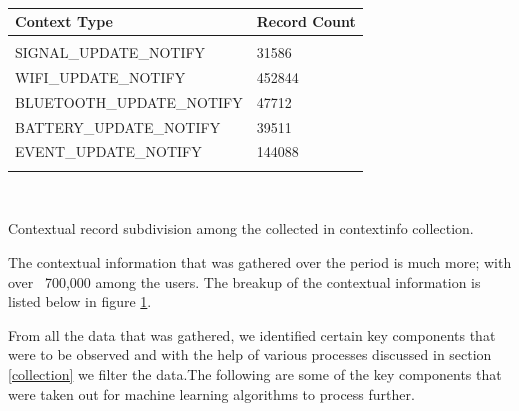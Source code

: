 \documentclass[prodmode,acmtecs]{acmsmall}
\begin{document}
\begin{table}[htdp]

\begin{tabularx}{\textwidth}{ XX }
 
  \textbf{Context Type} & \textbf{Record Count} \\
   \hline
   \\
  SIGNAL\_UPDATE\_NOTIFY  & 31586  \\
  WIFI\_UPDATE\_NOTIFY   & 452844  \\
  BLUETOOTH\_UPDATE\_NOTIFY   &  47712    \\ 
  BATTERY\_UPDATE\_NOTIFY  & 39511  \\
  EVENT\_UPDATE\_NOTIFY   &  144088    \\ 
  \\
   \hline
  \end{tabularx}
\\
\caption{}{\begin{center}Contextual record subdivision among the collected in contextinfo collection.\end{center}}
\label{contextcount}
\end{table}%


The contextual information that was gathered over the period is much more; with over ~700,000 among the users. The breakup of the contextual information is listed below in figure \ref{contextcount}.

From all the data that was gathered, we identified certain key components that were to be observed and with the help of various processes discussed in section \ref{collection} we filter the data.The following are some of the key components that were taken out for machine learning algorithms to process further.
\end{document}

